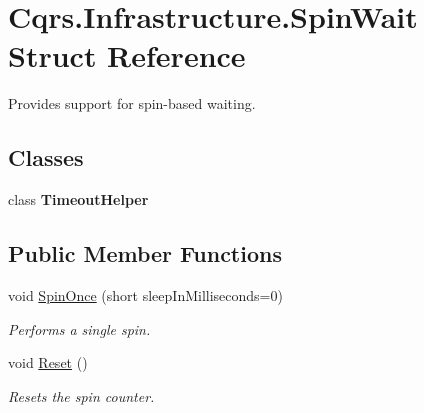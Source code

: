 \hypertarget{structCqrs_1_1Infrastructure_1_1SpinWait}{}\section{Cqrs.\+Infrastructure.\+Spin\+Wait Struct Reference}
\label{structCqrs_1_1Infrastructure_1_1SpinWait}


Provides support for spin-\/based waiting.  


\subsection*{Classes}
\begin{DoxyCompactItemize}
\item 
class {\bfseries Timeout\+Helper}
\end{DoxyCompactItemize}
\subsection*{Public Member Functions}
\begin{DoxyCompactItemize}
\item 
void \hyperlink{structCqrs_1_1Infrastructure_1_1SpinWait_a2df9b40d5281fda47702cc99fac7e6d3_a2df9b40d5281fda47702cc99fac7e6d3}{Spin\+Once} (short sleep\+In\+Milliseconds=0)
\begin{DoxyCompactList}\small\item\em Performs a single spin. \end{DoxyCompactList}\item 
void \hyperlink{structCqrs_1_1Infrastructure_1_1SpinWait_a32a06438f849dc88a0fce77b23e3271e_a32a06438f849dc88a0fce77b23e3271e}{Reset} ()
\begin{DoxyCompactList}\small\item\em Resets the spin counter. \end{DoxyCompactList}\end{DoxyCompactItemize}
